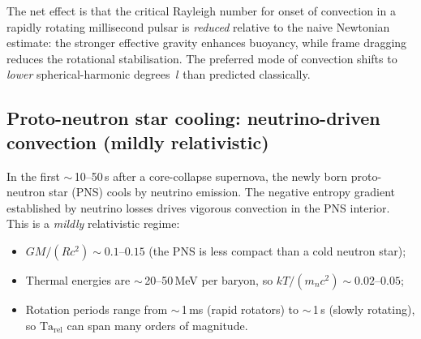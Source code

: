 The net effect is that the critical Rayleigh number for onset of
convection in a rapidly rotating millisecond pulsar is
\emph{reduced} relative to the naive Newtonian estimate: the
stronger effective gravity enhances buoyancy, while frame dragging
reduces the rotational stabilisation.  The preferred mode of
convection shifts to \emph{lower} spherical-harmonic degrees~$l$
than predicted classically.

\subsection{Proto-neutron star cooling: neutrino-driven convection
  (mildly relativistic)}\label{sec:rel-63c}

In the first $\sim$\,10--50\,s after a core-collapse supernova,
the newly born proto-neutron star (PNS) cools by neutrino
emission.  The negative entropy gradient established by
neutrino losses drives vigorous convection in the PNS interior.
This is a \emph{mildly} relativistic regime:
\begin{itemize}
\item $GM/(Rc^{2}) \sim 0.1$--$0.15$ (the PNS is less compact
  than a cold neutron star);
\item Thermal energies are $\sim$\,20--50\,MeV per baryon, so
  $kT/(m_{n}c^{2}) \sim 0.02$--$0.05$;
\item Rotation periods range from $\sim$\,1\,ms (rapid rotators)
  to $\sim$\,1\,s (slowly rotating), so
  $\mathrm{Ta}_{\mathrm{rel}}$ can span many orders of magnitude.
\end{itemize}

